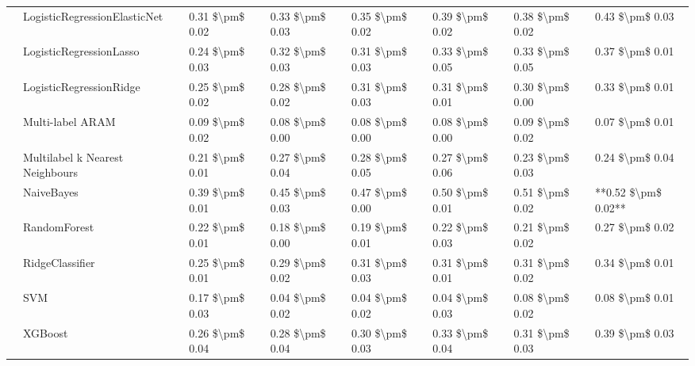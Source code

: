 \begin{tabular}{llllllll}
   & LogisticRegressionElasticNet &  0.31 \$\textbackslash pm\$ 0.02 &           0.33 \$\textbackslash pm\$ 0.03 &       0.35 \$\textbackslash pm\$ 0.02 &        0.39 \$\textbackslash pm\$ 0.02 &                         0.38 \$\textbackslash pm\$ 0.02 &      0.43 \$\textbackslash pm\$ 0.03 \\
   & LogisticRegressionLasso &  0.24 \$\textbackslash pm\$ 0.03 &           0.32 \$\textbackslash pm\$ 0.03 &       0.31 \$\textbackslash pm\$ 0.03 &        0.33 \$\textbackslash pm\$ 0.05 &                         0.33 \$\textbackslash pm\$ 0.05 &      0.37 \$\textbackslash pm\$ 0.01 \\
   & LogisticRegressionRidge &  0.25 \$\textbackslash pm\$ 0.02 &           0.28 \$\textbackslash pm\$ 0.02 &       0.31 \$\textbackslash pm\$ 0.03 &        0.31 \$\textbackslash pm\$ 0.01 &                         0.30 \$\textbackslash pm\$ 0.00 &      0.33 \$\textbackslash pm\$ 0.01 \\
   & Multi-label ARAM &  0.09 \$\textbackslash pm\$ 0.02 &           0.08 \$\textbackslash pm\$ 0.00 &       0.08 \$\textbackslash pm\$ 0.00 &        0.08 \$\textbackslash pm\$ 0.00 &                         0.09 \$\textbackslash pm\$ 0.02 &      0.07 \$\textbackslash pm\$ 0.01 \\
   & Multilabel k Nearest Neighbours &  0.21 \$\textbackslash pm\$ 0.01 &           0.27 \$\textbackslash pm\$ 0.04 &       0.28 \$\textbackslash pm\$ 0.05 &        0.27 \$\textbackslash pm\$ 0.06 &                         0.23 \$\textbackslash pm\$ 0.03 &      0.24 \$\textbackslash pm\$ 0.04 \\
   & NaiveBayes &  0.39 \$\textbackslash pm\$ 0.01 &           0.45 \$\textbackslash pm\$ 0.03 &       0.47 \$\textbackslash pm\$ 0.00 &        0.50 \$\textbackslash pm\$ 0.01 &                         0.51 \$\textbackslash pm\$ 0.02 &  **0.52 \$\textbackslash pm\$ 0.02** \\
   & RandomForest &  0.22 \$\textbackslash pm\$ 0.01 &           0.18 \$\textbackslash pm\$ 0.00 &       0.19 \$\textbackslash pm\$ 0.01 &        0.22 \$\textbackslash pm\$ 0.03 &                         0.21 \$\textbackslash pm\$ 0.02 &      0.27 \$\textbackslash pm\$ 0.02 \\
   & RidgeClassifier &  0.25 \$\textbackslash pm\$ 0.01 &           0.29 \$\textbackslash pm\$ 0.02 &       0.31 \$\textbackslash pm\$ 0.03 &        0.31 \$\textbackslash pm\$ 0.01 &                         0.31 \$\textbackslash pm\$ 0.02 &      0.34 \$\textbackslash pm\$ 0.01 \\
   & SVM &  0.17 \$\textbackslash pm\$ 0.03 &           0.04 \$\textbackslash pm\$ 0.02 &       0.04 \$\textbackslash pm\$ 0.02 &        0.04 \$\textbackslash pm\$ 0.03 &                         0.08 \$\textbackslash pm\$ 0.02 &      0.08 \$\textbackslash pm\$ 0.01 \\
   & XGBoost &  0.26 \$\textbackslash pm\$ 0.04 &           0.28 \$\textbackslash pm\$ 0.04 &       0.30 \$\textbackslash pm\$ 0.03 &        0.33 \$\textbackslash pm\$ 0.04 &                         0.31 \$\textbackslash pm\$ 0.03 &      0.39 \$\textbackslash pm\$ 0.03 \\
\bottomrule
\end{tabular}
